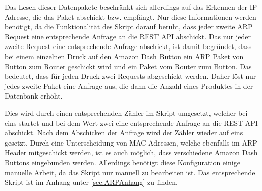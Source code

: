 Das Lesen dieser Datenpakete beschränkt sich allerdings auf das Erkennen der \ac{IP} Adresse, die das Paket abschickt bzw. empfängt. Nur diese Informationen werden benötigt, da die Funktionalität des Skript darauf beruht, dass jeder zweite \ac{ARP} Request eine entsprechende Anfrage an die \ac{REST} \ac{API} abschickt. Das nur jeder zweite Request eine entsprechende Anfrage abschickt, ist damit begründet, dass bei einem einzelnen Druck auf den Amazon Dash Button ein \ac{ARP} Paket von Button zum Router geschickt wird und ein Paket vom Router zum Button. Das bedeutet, dass für jeden Druck zwei Requests abgeschickt werden. Daher löst nur jedes zweite Paket eine Anfrage aus, die dann die Anzahl eines Produktes in der Datenbank erhöht. 

Dies wird durch einen entsprechenden Zähler im Skript umgesetzt, welcher bei eins startet und bei dem Wert zwei eine entsprechende Anfrage an die \ac{REST} \ac{API} abschickt. Nach dem Abschicken der Anfrage wird der Zähler wieder auf eins gesetzt. 
Durch eine Unterscheidung von \ac{MAC} Adressen, welche ebenfalls im \ac{ARP} Header mitgeschickt werden, ist es auch möglich, dass verschiedene Amazon Dash Buttons eingebunden werden. 
Allerdings benötigt diese Konfiguration einige manuelle Arbeit, da das Skript nur manuell zu bearbeiten ist. 
Das entsprechende Skript ist im Anhang unter \ref{sec:ARPAnhang} zu finden.